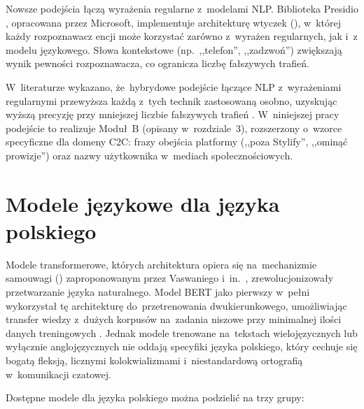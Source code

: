 Nowsze podejścia łączą wyrażenia regularne z~modelami NLP. Biblioteka
Presidio \cite{bib:presidio}, opracowana przez Microsoft, implementuje
architekturę wtyczek (), w~której każdy
rozpoznawacz encji może korzystać zarówno z~wyrażen regularnych, jak i~z modelu językowego.
Słowa kontekstowe (np.\ ,,telefon'', ,,zadzwoń'') zwiększają wynik pewności
rozpoznawacza, co ogranicza liczbę fałszywych trafień.

W~literaturze wykazano, że~hybrydowe podejście łączące NLP z~wyrażeniami
regularnymi przewyższa każdą z~tych technik zastosowaną osobno, uzyskując
wyższą precyzję przy mniejszej liczbie fałszywych trafień \cite{bib:presidio}.
W~niniejszej pracy podejście to realizuje Moduł~B (opisany w~rozdziale~3),
rozszerzony o~wzorce specyficzne dla domeny C2C: frazy obejścia platformy
(,,poza Stylify'', ,,ominąć prowizje'') oraz nazwy użytkownika
w~mediach społecznościowych.

\section{Modele językowe dla języka polskiego}
\label{sec:nlp-pl}

Modele transformerowe, których architektura opiera się na~mechanizmie
samouwagi () zaproponowanym przez Vaswaniego i~in.\
\cite{bib:attention}, zrewolucjonizowały przetwarzanie języka naturalnego.
Model BERT \cite{bib:bert} jako pierwszy w~pełni wykorzystał tę architekturę
do~przetrenowania dwukierunkowego, umożliwiając transfer wiedzy z~dużych korpusów
na~zadania niszowe przy minimalnej ilości danych treningowych
\cite{bib:transformers_survey}. Jednak modele trenowane na~tekstach
wielojęzycznych lub wyłącznie anglojęzycznych nie oddają specyfiki języka
polskiego, który cechuje się bogatą fleksją, licznymi kolokwializmami
i~niestandardową ortografią w~komunikacji czatowej.

Dostępne modele dla języka polskiego można podzielić na trzy grupy:

